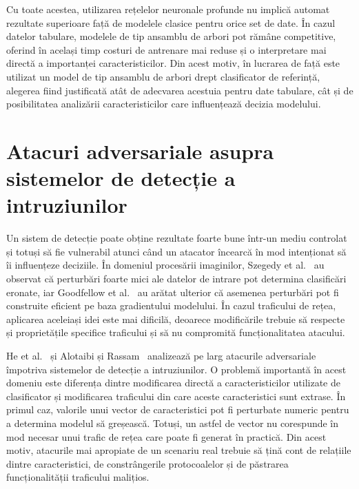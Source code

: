 Cu toate acestea, utilizarea rețelelor neuronale profunde nu implică automat rezultate superioare față de modelele clasice pentru orice set de date. În cazul datelor tabulare, modelele de tip ansamblu de arbori pot rămâne competitive, oferind în același timp costuri de antrenare mai reduse și o interpretare mai directă a importanței caracteristicilor. Din acest motiv, în lucrarea de față este utilizat un model de tip ansamblu de arbori drept clasificator de referință, alegerea fiind justificată atât de adecvarea acestuia pentru date tabulare, cât și de posibilitatea analizării caracteristicilor care influențează decizia modelului.


\section{Atacuri adversariale asupra sistemelor de detecție a intruziunilor}\label{sec:adversarial}

Un sistem de detecție poate obține rezultate foarte bune într-un mediu controlat și totuși să fie vulnerabil atunci când un atacator încearcă în mod intenționat să îi influențeze deciziile. În domeniul procesării imaginilor, Szegedy et al.~\cite{szegedy2014intriguing} au observat că perturbări foarte mici ale datelor de intrare pot determina clasificări eronate, iar Goodfellow et al.~\cite{goodfellow2015explaining} au arătat ulterior că asemenea perturbări pot fi construite eficient pe baza gradientului modelului. În cazul traficului de rețea, aplicarea aceleiași idei este mai dificilă, deoarece modificările trebuie să respecte și proprietățile specifice traficului și să nu compromită funcționalitatea atacului.

He et al.~\cite{he2023adversarial} și Alotaibi și Rassam~\cite{alotaibi2023adversarial} analizează pe larg atacurile adversariale împotriva sistemelor de detecție a intruziunilor. O problemă importantă în acest domeniu este diferența dintre modificarea directă a caracteristicilor utilizate de clasificator și modificarea traficului din care aceste caracteristici sunt extrase. În primul caz, valorile unui vector de caracteristici pot fi perturbate numeric pentru a determina modelul să greșească. Totuși, un astfel de vector nu corespunde în mod necesar unui trafic de rețea care poate fi generat în practică. Din acest motiv, atacurile mai apropiate de un scenariu real trebuie să țină cont de relațiile dintre caracteristici, de constrângerile protocoalelor și de păstrarea funcționalității traficului malițios.

